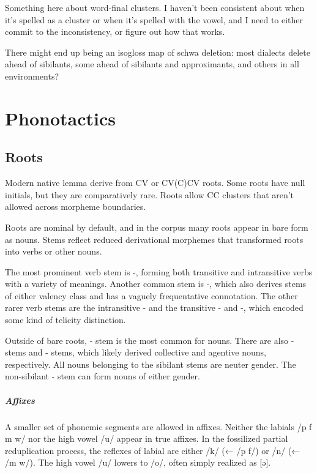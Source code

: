 \begin{kaobox}[frametitle=\sc todo:] 
Something here about word-final clusters. I haven't been consistent about when it's spelled as a cluster or when it's spelled with the vowel, and I need to either commit to the inconsistency, or figure out how that works.
\end{kaobox}

\begin{kaobox}[frametitle=\sc todo:] 
There might end up being an isogloss map of schwa deletion: most dialects delete ahead of sibilants, some ahead of sibilants and approximants, and others in all environments?
\end{kaobox}

\setchapterpreamble[u]{\margintoc}
\chapter{Phonotactics}
\section{Roots}
Modern native lemma derive from CV or CV(C)CV roots. Some roots have null initials, but they are comparatively rare. Roots allow CC clusters that aren't allowed across morpheme boundaries.

Roots are nominal by default, and in the corpus many roots appear in bare form as nouns. Stems reflect reduced derivational morphemes that transformed roots into verbs or other nouns.

The most prominent verb stem is -, forming both transitive and intransitive verbs with a variety of meanings. Another common stem is -, which also derives stems of either valency class and has a vaguely frequentative connotation. The other rarer verb stems are the intransitive - and the transitive - and -, which encoded some kind of telicity distinction.

Outside of bare roots, - stem is the most common for nouns. There are also - stems and - stems, which likely derived collective and agentive nouns, respectively. All nouns belonging to the sibilant stems are neuter gender. The non-sibilant - stem can form nouns of either gender.

\paragraph{Affixes}
A smaller set of phonemic segments are allowed in affixes. Neither the labials /p f m w/ nor the high vowel /u/ appear in true affixes. In the fossilized partial reduplication process, the reflexes of labial are either /k/ (← /p f/) or /n/ (← /m w/). The high vowel /u/ lowers to /o/, often simply realized as [ə].